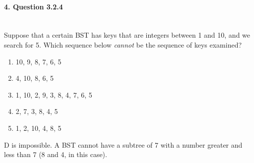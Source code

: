 \documentclass{article}
\begin{document}
\paragraph{\Large 4. Question 3.2.4}\mbox{}\\
Suppose that a certain BST has keys that are integers between 1 and 10, and we search for 5. Which sequence below \textit{cannot} be the sequence of keys examined?
\begin{enumerate}
\renewcommand{\theenumi}{\Alph{enumi}}
	\item 10, 9, 8, 7, 6, 5
	\item 4, 10, 8, 6, 5
	\item 1, 10, 2, 9, 3, 8, 4, 7, 6, 5
	\item 2, 7, 3, 8, 4, 5
	\item 1, 2, 10, 4, 8, 5
\end{enumerate}

D is impossible. A BST cannot have a subtree of 7 with a number greater and less than 7 (8 and 4, in this case).
\end{document}
